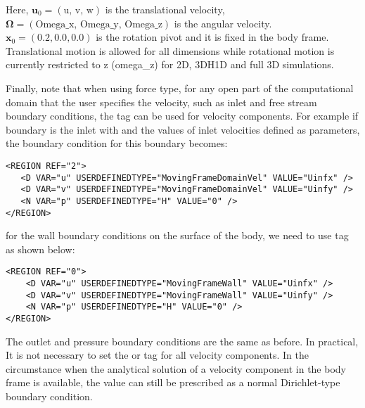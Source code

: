 Here, $\mathbf{u}_0 = (\text{u, v, w})$ is the translational velocity, $\mathbf{\Omega}=(\text{Omega\_x, Omega\_y, Omega\_z})$ is the angular velocity.
$\mathbf{x}_0=(0.2, 0.0, 0.0)$ is the rotation pivot and it is fixed in the body frame.
Translational motion is allowed for all dimensions while rotational motion is currently restricted to z (omega\_z) for 2D, 3DH1D and full 3D simulations.

Finally, note that when using  force type, for any open part of the computational domain that the user specifies the velocity, such as inlet and free stream boundary conditions, the  tag can be used for velocity components. For example if boundary  is the inlet with  and  the values of inlet velocities defined as parameters, the boundary condition for this boundary becomes:

\begin{lstlisting}[style=XMLStyle]
<REGION REF="2"> 
   <D VAR="u" USERDEFINEDTYPE="MovingFrameDomainVel" VALUE="Uinfx" />
   <D VAR="v" USERDEFINEDTYPE="MovingFrameDomainVel" VALUE="Uinfy" />
   <N VAR="p" USERDEFINEDTYPE="H" VALUE="0" />  
</REGION>
\end{lstlisting}

for the wall boundary conditions on the surface of the body, we need to use  tag as shown below:

\begin{lstlisting}[style=XMLStyle]
<REGION REF="0"> 
    <D VAR="u" USERDEFINEDTYPE="MovingFrameWall" VALUE="Uinfx" />
    <D VAR="v" USERDEFINEDTYPE="MovingFrameWall" VALUE="Uinfy" />
    <N VAR="p" USERDEFINEDTYPE="H" VALUE="0" />  
</REGION>
\end{lstlisting}

The outlet and pressure boundary conditions are the same as before. In practical, It is not necessary to set the  or  tag for all velocity components. In the circumstance when the analytical solution of a velocity component in the body frame is available, the value can still be prescribed as a normal Dirichlet-type boundary condition.

